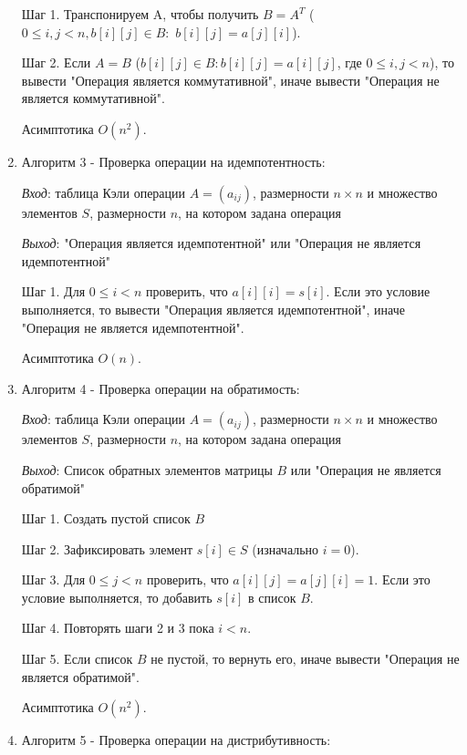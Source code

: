 \documentclass[spec, och, labwork]{shiza}
\begin{document}
\begin{enumerate}
                Шаг 1. Транспонируем A, чтобы получить $B = A^T$ ($0 \leq i, j < n, b[i][j] \in B:$ $b[i][j] = a[j][i]$).

                Шаг 2. Если $A = B$ ($b[i][j] \in B: b[i][j] = a[i][j] $, где $0 \leq i, j < n$), то вывести "Операция является коммутативной", иначе вывести "Операция не является коммутативной".

                Асимптотика $O(n^2)$.

                \item Алгоритм 3 - Проверка операции на идемпотентность:
                
                \textit{Вход}: таблица Кэли операции $A = (a_{ij})$, размерности $n \times n$ и множество элементов $S$, размерности $n$, на котором задана операция

                \textit{Выход}: "Операция является идемпотентной" или "Операция не является идемпотентной"

                Шаг 1. Для $0 \leq i < n$ проверить, что $a[i][i] = s[i]$. Если это условие выполняется, то вывести "Операция является идемпотентной", иначе "Операция не является идемпотентной".

                Асимптотика $O(n)$.

                \item Алгоритм 4 - Проверка операции на обратимость:
                
                \textit{Вход}: таблица Кэли операции $A = (a_{ij})$, размерности $n \times n$ и множество элементов $S$, размерности $n$, на котором задана операция

                \textit{Выход}: Список обратных элементов матрицы $B$ или "Операция не является обратимой"

                Шаг 1. Создать пустой список $B$

                Шаг 2. Зафиксировать элемент $s[i] \in S$ (изначально $i = 0$).

                Шаг 3. Для $0 \leq j < n$ проверить, что $a[i][j] = a[j][i] = 1$. Если это условие выполняется, то добавить $s[i]$ в список $B$.

                Шаг 4. Повторять шаги 2 и 3 пока $i < n$.

                Шаг 5. Если список $B$ не пустой, то вернуть его, иначе вывести "Операция не является обратимой".

                Асимптотика $O(n^2)$.

                \item Алгоритм 5 - Проверка операции на дистрибутивность:
                

\end{enumerate}
\end{document}
